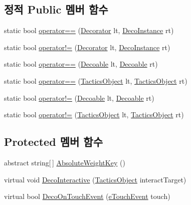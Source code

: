 \subsection*{정적 Public 멤버 함수}
\begin{DoxyCompactItemize}
\item 
static bool \hyperlink{class_m_c_n_1_1_decorator_a4c4c97e4a4dcf1a66e764740a5bbf3c6}{operator==} (\hyperlink{class_m_c_n_1_1_decorator}{Decorator} lt, \hyperlink{class_m_c_n_1_1_deco_instance}{Deco\+Instance} rt)
\item 
static bool \hyperlink{class_m_c_n_1_1_decorator_a89e2f61a0974c51610a0c8d14ef6962a}{operator!=} (\hyperlink{class_m_c_n_1_1_decorator}{Decorator} lt, \hyperlink{class_m_c_n_1_1_deco_instance}{Deco\+Instance} rt)
\item 
static bool \hyperlink{class_m_c_n_1_1_decoable_a6004bbc5f208c3031388c9d6e8f8359b}{operator==} (\hyperlink{class_m_c_n_1_1_decoable}{Decoable} lt, \hyperlink{class_m_c_n_1_1_decoable}{Decoable} rt)
\item 
static bool \hyperlink{class_tactics_object_a18f2979a4bf81dc755fbc17e425809f0}{operator==} (\hyperlink{class_tactics_object}{Tactics\+Object} lt, \hyperlink{class_tactics_object}{Tactics\+Object} rt)
\item 
static bool \hyperlink{class_m_c_n_1_1_decoable_aa75e4102ebd7265f577028b407534d27}{operator!=} (\hyperlink{class_m_c_n_1_1_decoable}{Decoable} lt, \hyperlink{class_m_c_n_1_1_decoable}{Decoable} rt)
\item 
static bool \hyperlink{class_tactics_object_a49e235618a22126faa6271243cd89710}{operator!=} (\hyperlink{class_tactics_object}{Tactics\+Object} lt, \hyperlink{class_tactics_object}{Tactics\+Object} rt)
\end{DoxyCompactItemize}
\subsection*{Protected 멤버 함수}
\begin{DoxyCompactItemize}
\item 
abstract string\mbox{[}$\,$\mbox{]} \hyperlink{class_m_c_n_1_1_decorator_add763642ece4015f68d63504291fc783}{Absolute\+Weight\+Key} ()
\item 
virtual void \hyperlink{class_m_c_n_1_1_decorator_a317f646a9053334fdbe28b9f1ae690a5}{Deco\+Interactive} (\hyperlink{class_tactics_object}{Tactics\+Object} interact\+Target)
\item 
virtual bool \hyperlink{class_m_c_n_1_1_decorator_abc499f6479fad929fc812e218d39a06d}{Deco\+On\+Touch\+Event} (\hyperlink{_touch_manager_8cs_ae33e321a424fe84ba8b2fdb81ad40a68}{e\+Touch\+Event} touch)
\end{DoxyCompactItemize}
